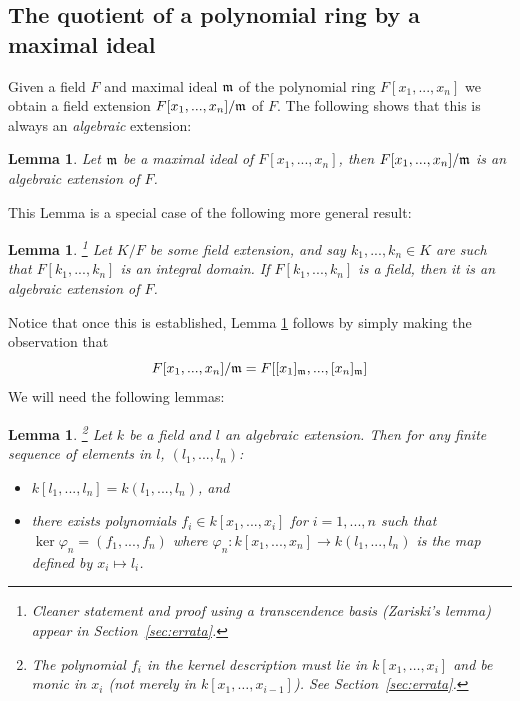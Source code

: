 \documentclass[12pt]{article}
\theoremstyle{plain}
\newtheorem{lemma}[thm]{Lemma}
\theoremstyle{definition}
\begin{document}
\subsection{The quotient of a polynomial ring by a maximal ideal}
\label{subsec:quotient_polynomial}
Given a field $F$ and maximal ideal $\frak{m}$ of the polynomial ring $F[x_1,...,x_n]$ we obtain a field extension $F[x_1,...,x_n]/\frak{m}$ of $F$. The following shows that this is always an \emph{algebraic} extension:
\begin{lemma}
\label{lem:algebraic}
Let $\frak{m}$ be a maximal ideal of $F[x_1,...,x_n]$, then $F[x_1,...,x_n]/\frak{m}$ is an algebraic extension of $F$.
\end{lemma}
This Lemma is a special case of the following more general result:
\begin{lemma}
\label{converse}\footnote{Cleaner statement and proof using a transcendence basis (Zariski's lemma) appear in Section~\ref{sec:errata}.}
Let $K/F$ be some field extension, and say $k_1,...,k_n \in K$ are such that $F[k_1,...,k_n]$ is an integral domain. If $F[k_1,...,k_n]$ is a field, then it is an algebraic extension of $F$.
\end{lemma}
Notice that once this is established, Lemma \ref{lem:algebraic} follows by simply making the observation that $$F[x_1,...,x_n]/\frak{m} = F[[x_1]_{\frak{m}},...,[x_n]_{\frak{m}}]$$
We will need the following lemmas:
\begin{lemma}
\label{lem:extension}\footnote{The polynomial $f_i$ in the kernel description must lie in $k[x_1,\ldots,x_i]$ and be monic in $x_i$ (not merely in $k[x_1,\ldots,x_{i-1}]$). See Section~\ref{sec:errata}.}
Let $k$ be a field and $l$ an algebraic extension. Then for any finite sequence of elements in $l$, $(l_1,...,l_n)$:
\begin{itemize}
    \item $k[l_1,...,l_n] = k(l_1,...,l_n)$, and
    \item there exists polynomials $f_i \in k[x_1,...,x_i]$ for $i= 1,...,n$ such that $\operatorname{ker}\varphi_n = (f_1,...,f_n)$ where $\varphi_n: k[x_1,...,x_n] \to k(l_1,...,l_n)$ is the map defined by $x_i \mapsto l_i$.
\end{itemize}
\end{lemma}
\end{document}
